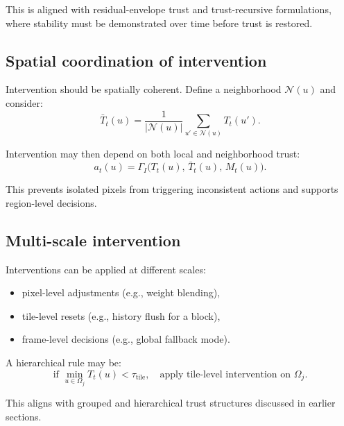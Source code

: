 \documentclass[11pt,letterpaper]{article}
\theoremstyle{gcresult}
\theoremstyle{definition}
\begin{document}
This is aligned with residual-envelope trust and trust-recursive formulations, where stability must be demonstrated over time before trust is restored.


\subsection{Spatial coordination of intervention}

Intervention should be spatially coherent. Define a neighborhood $\mathcal{N}(u)$ and consider:
\begin{equation}
\bar{T}_t(u)=\frac{1}{|\mathcal{N}(u)|}\sum_{u'\in\mathcal{N}(u)}T_t(u').
\end{equation}

Intervention may then depend on both local and neighborhood trust:
\begin{equation}
a_t(u)=\Gamma_I\!\bigl(T_t(u),\,\bar{T}_t(u),\,M_t(u)\bigr).
\end{equation}

This prevents isolated pixels from triggering inconsistent actions and supports region-level decisions.


\subsection{Multi-scale intervention}

Interventions can be applied at different scales:
\begin{itemize}[leftmargin=1.5em]
    \item pixel-level adjustments (e.g., weight blending),
    \item tile-level resets (e.g., history flush for a block),
    \item frame-level decisions (e.g., global fallback mode).
\end{itemize}

A hierarchical rule may be:
\begin{equation}
\text{if } \min_{u\in\Omega_j} T_t(u) < \tau_{\mathrm{tile}},
\quad \text{apply tile-level intervention on }\Omega_j.
\end{equation}

This aligns with grouped and hierarchical trust structures discussed in earlier sections.
\end{document}
